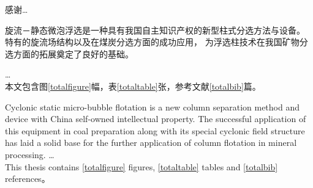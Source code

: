 \begin{acknowledgements}
	感谢\dots \\

\end{acknowledgements}

\begin{cabstract}
	旋流－静态微泡浮选是一种具有我国自主知识产权的新型柱式分选方法与设备。
	特有的旋流场结构以及在煤炭分选方面的成功应用，
	为浮选柱技术在我国矿物分选方面的拓展奠定了良好的基础。


	\dots \\

	本文包含图\ref{totalfigure}幅，表\ref{totaltable}张，参考文献\ref{totalbib}篇。
\end{cabstract}

\begin{eabstract}
	Cyclonic static micro-bubble flotation is a new column separation method and device with China 
	self-owned intellectual property.  The successful application of this equipment in coal preparation 
	along with its special cyclonic field structure has laid a solid base for the further application of 
	column flotation in mineral processing.
	\dots \\


	This thesis contains \ref{totalfigure} figures, \ref{totaltable} tables and \ref{totalbib} references。
\end{eabstract}